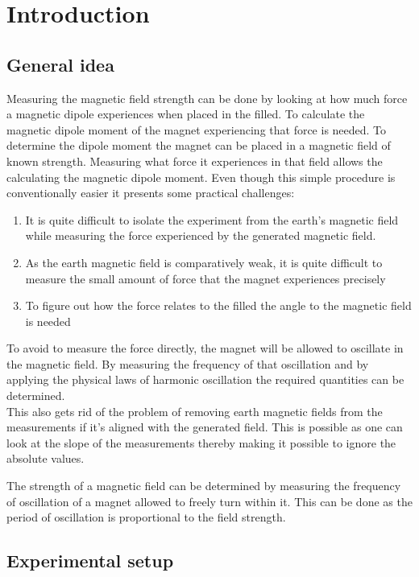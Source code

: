 \documentclass[14pt]{article}
\begin{document}
\section{Introduction}
\subsection{General idea}

Measuring the magnetic field strength can be done by looking at how much force a magnetic dipole experiences when
placed in the filled. To calculate the magnetic dipole moment of the magnet experiencing that force is
needed. To determine the dipole moment the magnet can be placed in a magnetic field of known strength. Measuring what force
it experiences in that field allows the calculating the magnetic dipole moment. Even though this simple procedure is
conventionally easier it presents some practical challenges:
\begin{enumerate}
\item It is quite difficult to isolate the experiment from the earth's magnetic field while measuring the force experienced
      by the generated magnetic field.
\item As the earth magnetic field is comparatively weak, it is quite difficult to measure the small amount of force
      that the magnet experiences precisely
\item To figure out how the force relates to the filled the angle to the magnetic field is needed
\end{enumerate}

To avoid to measure the force directly, the magnet will be allowed to oscillate in the magnetic field.
By measuring the frequency of that oscillation and by applying the physical laws of harmonic 
oscillation the required quantities can be determined.\\

This also gets rid of the problem of removing earth magnetic fields from the measurements if it's aligned with the generated
field. This is possible as one can look at the slope of the measurements thereby making it possible to ignore the absolute
values.

The strength of a magnetic field can be determined by measuring the frequency of oscillation of a magnet allowed to freely
turn within it. This can be done as the period of oscillation is proportional to the field strength. 

\subsection{Experimental setup}
\end{document}
